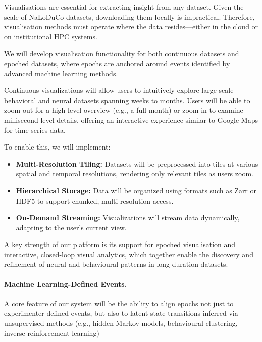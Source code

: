 Visualisations are essential for extracting insight from any dataset. Given the
scale of NaLoDuCo datasets, downloading them locally is impractical. Therefore,
visualisation methods must operate where the data resides—either in the cloud
or on institutional HPC systems.

We will develop visualisation functionality for both continuous datasets and
epoched datasets, where epochs are anchored around events identified by
advanced machine learning methods.


Continuous visualizations will allow users to intuitively explore large-scale
behavioral and neural datasets spanning weeks to months. Users will be able to
zoom out for a high-level overview (e.g., a full month) or zoom in to examine
millisecond-level details, offering an interactive experience similar to Google
Maps for time series data.

To enable this, we will implement:

\begin{itemize}

	\item\textbf{Multi-Resolution Tiling:} Datasets will be preprocessed into
	tiles at various spatial and temporal resolutions, rendering only relevant
	tiles as users zoom.

	\item\textbf{Hierarchical Storage:} Data will be organized using formats
	such as Zarr or HDF5 to support chunked, multi-resolution access.

	\item\textbf{On-Demand Streaming:} Visualizations will stream data
	dynamically, adapting to the user's current view.

\end{itemize}


A key strength of our platform is its support for epoched visualisation and
interactive, closed-loop visual analytics, which together enable the discovery
and refinement of neural and behavioural patterns in long-duration datasets.

\paragraph{Machine Learning-Defined Events.} A core feature of our system will
be the ability to align epochs not just to experimenter-defined events, but
also to latent state transitions inferred via unsupervised methods (e.g.,
hidden Markov models, behavioural clustering, inverse reinforcement learning)

